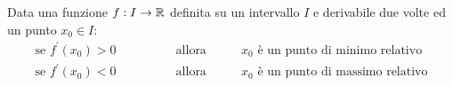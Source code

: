 \begin{coro}
Data una funzione $f:I\rightarrow\mathbb{R}$ definita su un intervallo $I$ e derivabile due volte ed un punto $x_0\in I$:
\begin{equation*}
\begin{array}{ *{3}{c} }
\text{se } f^\prime(x_0)>0 \qquad & \qquad \text{allora} & \qquad x_0 \text{ è un punto di minimo relativo} \\
\text{se } f^\prime(x_0)<0 \qquad & \qquad \text{allora} & \qquad x_0 \text{ è un punto di massimo relativo} \\
\end{array}
\end{equation*}
\end{coro}